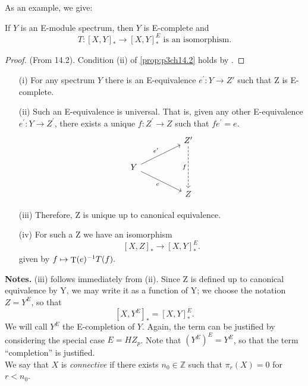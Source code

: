 \documentclass[../main]{subfiles}
\begin{document}
    As an example, we give:
    \begin{corollary} \label{cor:p3ch14.3}
    If $Y$ is an E-module spectrum, then $Y$ is E-complete and 
    $$
    T\colon \left[ X,Y \right] _{\ast} \to \left[ X,Y \right]^E _{\ast} \text{ is an isomorphism.}
    $$ 
    \begin{proof} 
        (From 14.2). Condition (ii) of \ref{prop:p3ch14.2} holds by .
    \end{proof}  
    \end{corollary}
   \begin{theorem} \label{thm:p3ch14.4}
     \begin{enumerate} 
       \item [(i)] For any spectrum $Y$ there is an E-equivalence  $e^{\prime}\colon Y \to Z'$ such that Z is E-complete. 
       \item [(ii)] Such an E-equivalence is universal. That is, given any other E-equivalence $e^{\prime}\colon Y \to Z^{\prime}$, there exists a unique $f\colon Z^{\prime} \to Z$ such that $fe^{\prime}=e$.
\[\begin{tikzcd}
	&& {Z'} \\
	Y \\
	&& Z
	\arrow["{e'}", from=2-1, to=1-3]
	\arrow["e"', from=2-1, to=3-3]
	\arrow["f"', dashed, from=1-3, to=3-3]
\end{tikzcd}\]
\item [(iii)] Therefore, Z is unique up to canonical equivalence.
\item [(iv)] For such a Z we have an isomorphism
  $$
  \left[ X, Z  \right]_{\ast} \to [X,Y]^E_{\ast}. 
  $$ 
  given by $f \mapsto \mathop{\mathrm{T}}(e)^{-1}T(f).$
     \end{enumerate}
     \textbf{Notes.} (iii) follows immediately from (ii). Since Z is defined up to canonical equivalence by Y, we may write it as a function of Y; we choose the notation  $Z = Y^E$, so that
     $$
     \left[ X,Y^E\right]_{\ast} = \left[ X,Y \right] ^E_{\ast}.
     $$ 
We will call $Y^E$ the E-completion of $Y$. Again, the term can be justified by considering the special case  $E=HZ _{p}$. Note that $(Y^E)^E=Y^E$, so that the term ``completion'' is justified.\\
We say that $X$ is \textit{connective} if there exists $n_{0} \in \mathbb{Z}$ such that $ \pi_{r}(X)=0$ for $r<n_{0}$. 
   \end{theorem}
   
\end{document}
